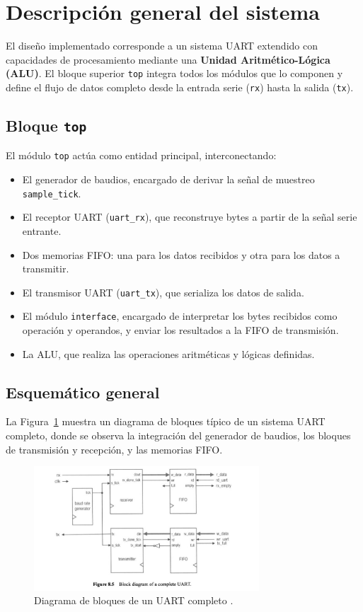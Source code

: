 \section{Descripción general del sistema}

El diseño implementado corresponde a un sistema UART extendido con capacidades de procesamiento mediante una \textbf{Unidad Aritmético-Lógica (ALU)}. El bloque superior \texttt{top} integra todos los módulos que lo componen y define el flujo de datos completo desde la entrada serie (\texttt{rx}) hasta la salida (\texttt{tx}).

\subsection{Bloque \texttt{top}}
El módulo \texttt{top} actúa como entidad principal, interconectando:
\begin{itemize}
    \item El generador de baudios, encargado de derivar la señal de muestreo \texttt{sample\_tick}.
    \item El receptor UART (\texttt{uart\_rx}), que reconstruye bytes a partir de la señal serie entrante.
    \item Dos memorias FIFO: una para los datos recibidos y otra para los datos a transmitir.
    \item El transmisor UART (\texttt{uart\_tx}), que serializa los datos de salida.
    \item El módulo \texttt{interface}, encargado de interpretar los bytes recibidos como operación y operandos, y enviar los resultados a la FIFO de transmisión.
    \item La ALU, que realiza las operaciones aritméticas y lógicas definidas.
\end{itemize}

\subsection{Esquemático general}
La Figura~\ref{fig:uart-general} muestra un diagrama de bloques típico de un sistema UART completo, donde se observa la integración del generador de baudios, los bloques de transmisión y recepción, y las memorias FIFO.

\begin{figure}[H]
    \centering
    \includegraphics[width=0.75\textwidth]{img/completeUART.jpeg}
    \caption{Diagrama de bloques de un UART completo \cite{libroUART}.}
    \label{fig:uart-general}
\end{figure}

